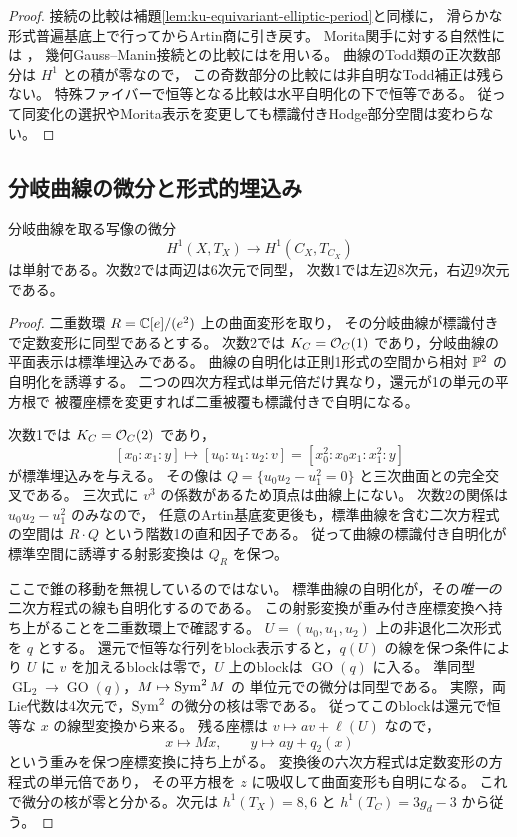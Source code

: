 \begin{proof}
接続の比較は補題\ref{lem:ku-equivariant-elliptic-period}と同様に，
滑らかな形式普遍基底上で行ってからArtin商に引き戻す。
Morita関手に対する自然性には
\cite[Theorem~3.32, Corollary~4.13]{Sheridan2020}，
幾何Gauss--Manin接続との比較には\cite[Theorem~0.1(3)]{Tu2024}を用いる。
曲線のTodd類の正次数部分は $H^1$ との積が零なので，
この奇数部分の比較には非自明なTodd補正は残らない。
特殊ファイバーで恒等となる比較は水平自明化の下で恒等である。
従って同変化の選択やMorita表示を変更しても標識付きHodge部分空間は変わらない。
\end{proof}

\subsection{分岐曲線の微分と形式的埋込み}

\begin{lemma}[分岐曲線への変形写像]
\label{lem:ku-branch-deformation-injective}
分岐曲線を取る写像の微分
\[
 H^1(X,T_X)\longrightarrow H^1(C_X,T_{C_X})
\]
は単射である。次数2では両辺は6次元で同型，
次数1では左辺8次元，右辺9次元である。
\end{lemma}
\begin{proof}
二重数環 $R=\mathbb C[e]/(e^2)$ 上の曲面変形を取り，
その分岐曲線が標識付きで定数変形に同型であるとする。
次数2では $K_C=\mathcal O_C(1)$ であり，分岐曲線の平面表示は標準埋込みである。
曲線の自明化は正則1形式の空間から相対 $\mathbb P^2$ の自明化を誘導する。
二つの四次方程式は単元倍だけ異なり，還元が1の単元の平方根で
被覆座標を変更すれば二重被覆も標識付きで自明になる。

次数1では $K_C=\mathcal O_C(2)$ であり，
\begin{equation}\label{eq:ku-branch-canonical-cone}
 [x_0:x_1:y]\longmapsto
 [u_0:u_1:u_2:v]=[x_0^2:x_0x_1:x_1^2:y]
\end{equation}
が標準埋込みを与える。
その像は $Q=\{u_0u_2-u_1^2=0\}$ と三次曲面との完全交叉である。
三次式に $v^3$ の係数があるため頂点は曲線上にない。
次数2の関係は $u_0u_2-u_1^2$ のみなので，
任意のArtin基底変更後も，標準曲線を含む二次方程式の空間は
$R\cdot Q$ という階数1の直和因子である。
従って曲線の標識付き自明化が標準空間に誘導する射影変換は
$Q_R$ を保つ。

ここで錐の移動を無視しているのではない。
標準曲線の自明化が，その\emph{唯一の}二次方程式の線も自明化するのである。
この射影変換が重み付き座標変換へ持ち上がることを二重数環上で確認する。
$U=(u_0,u_1,u_2)$ 上の非退化二次形式を $q$ とする。
還元で恒等な行列をblock表示すると，$q(U)$ の線を保つ条件により
$U$ に $v$ を加えるblockは零で，$U$ 上のblockは
$\operatorname{GO}(q)$ に入る。
準同型 $\operatorname{GL}_2\to\operatorname{GO}(q)$，$M\mapsto\operatorname{Sym}^2M$ の
単位元での微分は同型である。
実際，両Lie代数は4次元で，$\operatorname{Sym}^2$ の微分の核は零である。
従ってこのblockは還元で恒等な $x$ の線型変換から来る。
残る座標は $v\mapsto av+\ell(U)$ なので，
\[
 x\mapsto Mx,\qquad y\mapsto ay+q_2(x)
\]
という重みを保つ座標変換に持ち上がる。
変換後の六次方程式は定数変形の方程式の単元倍であり，
その平方根を $z$ に吸収して曲面変形も自明になる。
これで微分の核が零と分かる。次元は $h^1(T_X)=8,6$ と
$h^1(T_C)=3g_d-3$ から従う。
\end{proof}

